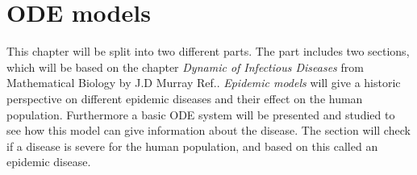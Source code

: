 \documentclass[%
twoside,                 %
final,                   %
chapterprefix=true,      %
open=right               %
10pt]{book}
\begin{document}
% 
% 
% 

\chapter{ODE models}
\label{section:ODE_models}
This chapter will be split into two different parts. The part includes two sections, which will be based on the chapter \emph{Dynamic of Infectious Diseases} from Mathematical Biology by J.D Murray Ref.\cite{murray2002mathematical}. \emph{Epidemic models} will give a historic perspective on different epidemic diseases and their effect on the human population. Furthermore a basic ODE system will be presented and studied to see how this model can give information about the disease. The section will check if a disease is severe for the human population, and based on this called an epidemic disease.
\end{document}
